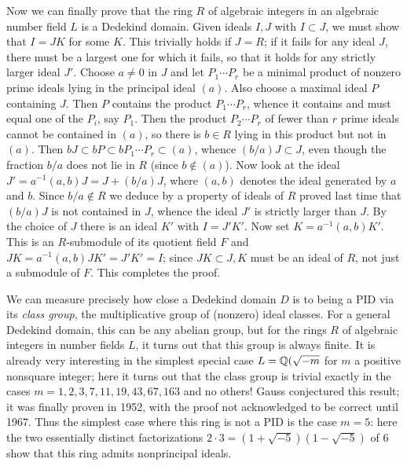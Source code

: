 Now we can finally prove that the ring $R$ of algebraic integers in an algebraic number field $L$ is a Dedekind domain.  Given ideals $I,J$ with $I\subset J$, we must show that $I=JK$ for some $K$.  This trivially holds if $J=R$; if it fails for any ideal $J$, there must be a largest one for which it fails, so that it holds for any strictly larger ideal $J'$.  Choose $a\ne0$ in $J$ and let $P_1\cdots P_r$ be a minimal product of nonzero prime ideals lying in the principal ideal $(a)$.  Also choose a maximal ideal $P$ containing $J$.  Then $P$ contains the product $P_1\cdots P_r$, whence it contains and must equal one of the $P_i$, say $P_1$.  Then the product $P_2\cdots P_r$ of fewer than $r$ prime ideals cannot be contained in $(a)$, so there is $b\in R$ lying in this product but not in $(a)$.  Then
$bJ\subset bP\subset bP_1\cdots P_r\subset (a)$, whence $(b/a)J\subset J$, even though the fraction $b/a$ does not lie in $R$ (since $b\notin (a)$).  Now look at the ideal $J' = a^{-1}(a,b)J =
J + (b/a)J$, where $(a,b)$ denotes the ideal generated by $a$ and $b$.  Since $b/a\notin R$ we deduce by a property of ideals of $R$ proved last time that $(b/a)J$ is not contained in $J$, whence the ideal $J'$ is strictly larger than $J$.  By the choice of $J$ there is an ideal $K'$ with $I=J'K'$.  Now set $K= a^{-1}(a,b)K'$.  This is an $R$-submodule of its quotient field $F$ and $JK = a^{-1}(a,b)JK' =
J'K' = I$; since $JK\subset J, K$ must be an ideal of $R$, not just a submodule of $F$.  This completes the proof.

We can measure precisely how close a Dedekind domain $D$ is to being a PID via its {\sl class group}, the multiplicative group of (nonzero) ideal classes.  For a general Dedekind domain, this can be any abelian group, but for the rings $R$ of algebraic integers in number fields $L$, it turns out that this group is always finite.  It is already very interesting in the simplest special case
$L=\Bbb Q(\sqrt{-m}$ for $m$ a positive nonsquare integer; here it turns out that the class group is trivial exactly in the cases $m = 1,2,3,7,11,19,43,67,163$ and no others!  Gauss conjectured this result; it was finally proven in 1952, with the proof not acknowledged to be correct until 1967.  Thus the simplest case where this ring is not a PID is the case $m=5$:  here the two essentially distinct factorizations $2\cdot 3 = (1+\sqrt{-5})(1-\sqrt{-5})$ of 6 show that this ring admits nonprincipal ideals.

